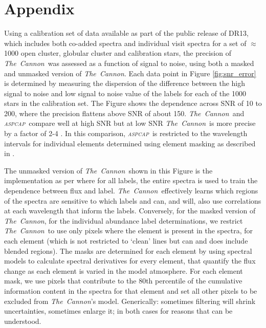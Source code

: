 \documentclass[14pt, preprint2]{aastex6}
\newcommand{\project}[1]{\textsl{#1}}
\newcommand{\tc}{\project{The~Cannon}}
\newcommand{\aspcap}{\project{\textsc{aspcap}}}
\begin{document}



\pagebreak

\section{Appendix}

Using a calibration set of data available as part of the public release of DR13, which includes both co-added spectra and individual visit spectra for a set of $\approx$ 1000 open cluster, globular cluster and calibration stars, the precision of \tc\ was assessed as a function of signal to noise, using both a masked and unmasked version of \tc. Each data point in Figure \ref{fig:snr_error} is determined by measuring the dispersion of the difference between the high signal to noise and low signal to noise value of the labels for each of the 1000 stars in the calibration set. The Figure shows the dependence across SNR of 10 to 200, where the precision flattens above SNR of about 150. \tc\ and \aspcap\ compare well at high SNR but at low SNR \tc\ is more precise by a factor of 2-4 \citep[also see][]{Ness2015}. In this comparison, \aspcap\ is restricted to the wavelength intervals for individual elements determined using element masking as described in \citet{GP2016}. 

The unmasked version of \tc\ shown in this Figure is the implementation as per \citet{Ness2015} where for all labels, the entire spectra is used to train the dependence between flux and label. \tc\ effectively learns which regions of the spectra are sensitive to which labels \citep[e.g.][]{Ness2016, Ho2016b} and can, and will, also use correlations at each wavelength that inform the labels. Conversely, for the masked version of \tc, for the individual abundance label determinations, we restrict \tc\ to use only pixels where the element is present in the spectra, for each element (which is not restricted to `clean' lines but can and does include blended regions). The masks are determined for each element by using spectral models to calculate spectral derivatives for every element, that quantify the flux change as each element is varied in the model atmosphere. For each element mask, we use pixels that contribute to the 80th percentile of the cumulative information content in the spectra for that element and set all other pixels to be excluded from \tc's model. Generically: sometimes filtering will shrink uncertainties, sometimes enlarge it; in both cases for reasons that can be understood. 
\end{document}
